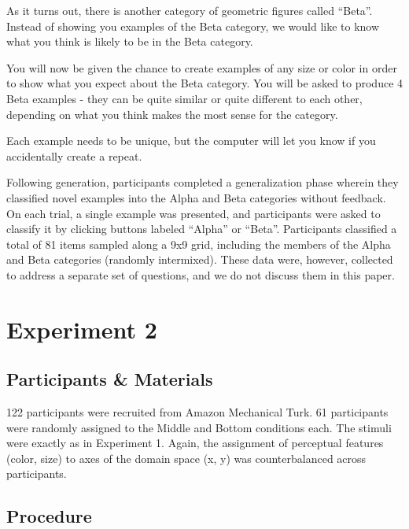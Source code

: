 \documentclass[12pt]{article}
\begin{document}
\begin{flushleft}
\begin{displayquote}
As it turns out, there is another category of geometric figures called ``Beta''. Instead of showing you examples of the Beta category, we would like to know what you think is likely to be in the Beta category. 

You will now be given the chance to create examples of any size or color in order to show what you expect about the Beta category. You will be asked to produce 4 Beta examples - they can be quite similar or quite different to each other, depending on what you think makes the most sense for the category.

Each example needs to be unique, but the computer will let you know if you accidentally create a repeat.
\end{displayquote}

Following generation, participants completed a generalization phase wherein they classified novel examples into the Alpha and Beta categories without feedback. On each trial, a single example was presented, and participants were asked to classify it by clicking buttons labeled ``Alpha'' or ``Beta''. Participants classified a total of 81 items sampled along a 9x9 grid, including the members of the Alpha and Beta categories (randomly intermixed). These data were, however, collected to address a separate set of questions, and we do not discuss them in this paper.




\clearpage

\section{Experiment 2}


\subsection{Participants \& Materials}

122 participants were recruited from Amazon Mechanical Turk. 61 participants were randomly assigned to the Middle and Bottom conditions each. The stimuli were exactly as in Experiment 1. Again, the assignment of perceptual features (color, size) to axes of the domain space (x, y) was counterbalanced across participants.

\subsection{Procedure}


\end{flushleft}
\end{document}
